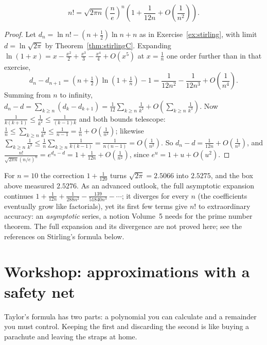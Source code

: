 \begin{proposition}\label{prop:stirlingnext}
\[n!=\sqrt{2\pi n}\left(\frac ne\right)^n\left(1+\frac1{12n}+O\!\left(\frac1{n^2}\right)\right).\]
\end{proposition}
\begin{proof}
Let $d_n=\ln n!-\left(n+\frac12\right)\ln n+n$ as in Exercise~\ref{ex:stirling}, with limit $d=\ln\sqrt{2\pi}$ by Theorem~\ref{thm:stirlingC}. Expanding $\ln(1+x)=x-\frac{x^2}2+\frac{x^3}3-\frac{x^4}4+O(x^5)$ at $x=\frac1n$ one order further than in that exercise,
\[
d_n-d_{n+1}=\left(n+\tfrac12\right)\ln\left(1+\tfrac1n\right)-1=\frac1{12n^2}-\frac1{12n^3}+O\!\left(\frac1{n^4}\right).
\]
Summing from $n$ to infinity, $d_n-d=\sum_{k\ge n}(d_k-d_{k+1})=\frac1{12}\sum_{k\ge n}\frac1{k^2}+O\!\left(\sum_{k\ge n}\frac1{k^3}\right)$. Now $\frac1{k(k+1)}\le\frac1{k^2}\le\frac1{(k-1)k}$ and both bounds telescope: $\frac1n\le\sum_{k\ge n}\frac1{k^2}\le\frac1{n-1}=\frac1n+O\left(\frac1{n^2}\right)$; likewise $\sum_{k\ge n}\frac1{k^3}\le\frac1{n}\sum_{k\ge n}\frac1{k(k-1)}=\frac1{n(n-1)}=O\left(\frac1{n^2}\right)$. So $d_n-d=\frac1{12n}+O\left(\frac1{n^2}\right)$, and $\frac{n!}{\sqrt{2\pi n}(n/e)^n}=e^{d_n-d}=1+\frac1{12n}+O\left(\frac1{n^2}\right)$, since $e^u=1+u+O(u^2)$.
\end{proof}

For $n=10$ the correction $1+\frac1{120}$ turns $\sqrt{2\pi}=2.5066$ into $2.5275$, and the box above measured $2.5276$. As an advanced outlook, the full asymptotic expansion continues $1+\frac1{12n}+\frac1{288n^2}-\frac{139}{51840n^3}-\cdots$; it diverges for every $n$ (the coefficients eventually grow like factorials), yet its first few terms give $n!$ to extraordinary accuracy: an \emph{asymptotic} series, a notion Volume~5 needs for the prime number theorem. The full expansion and its divergence are not proved here; see the references on Stirling's formula below.


\section{Workshop: approximations with a safety net}
Taylor's formula has two parts: a polynomial you can calculate and a remainder you must control. Keeping the first and discarding the second is like buying a parachute and leaving the straps at home.

